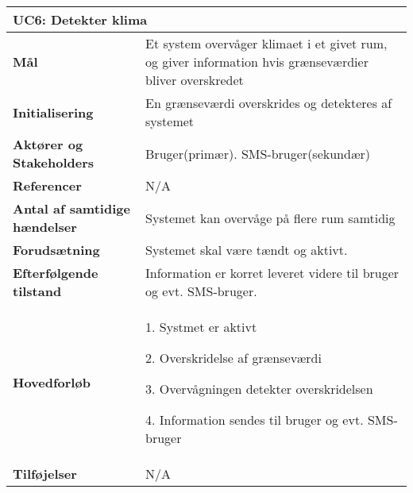 \begin{table}[H] \centering
\begin{tabular}{|p{6cm}|p{8cm}|}
	\hline
\multicolumn{2}{|l|}{\textbf{UC6: Detekter klima}} \\\hline
\textbf{Mål} &
Et system overvåger klimaet i et givet rum, og giver information hvis grænseværdier bliver overskredet  \\\hline

\textbf{Initialisering} &
 En grænseværdi overskrides og detekteres af systemet \\\hline
 
\textbf{Aktører og Stakeholders} &
Bruger(primær). SMS-bruger(sekundær) \\\hline

\textbf{Referencer} &
N/A \\\hline

\textbf{Antal af samtidige hændelser} &
Systemet kan overvåge på flere rum samtidig \\\hline

\textbf{Forudsætning} &
Systemet skal være tændt og aktivt. \\\hline

\textbf{Efterfølgende tilstand} &
Information er korret leveret videre til bruger og evt. SMS-bruger. \\\hline

\textbf{Hovedforløb} &
1. Systmet er aktivt

2. Overskridelse af grænseværdi

3. Overvågningen detekter overskridelsen 

4. Information sendes til bruger og evt. SMS-bruger
  \\\hline

\textbf{Tilføjelser} &
N/A \\\hline
	\end{tabular}
	\label{UC6} 
\end{table}
